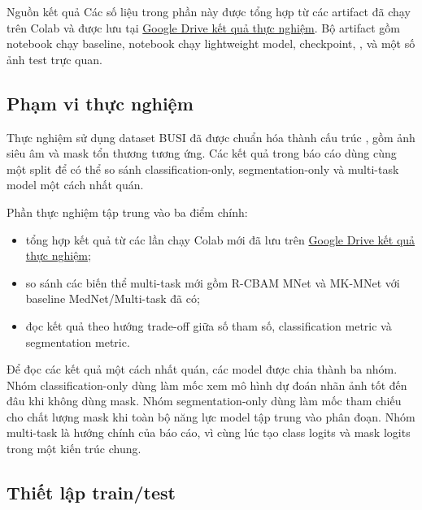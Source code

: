 \documentclass[12pt,a4paper]{article}
\newcommand{\resultdrive}{\href{https://drive.google.com/drive/folders/1ZFqnT5X12mwOahLquEp8JkauidLAaHGb}{Google Drive kết quả thực nghiệm}}
\begin{document}
\begin{methodbox}{Nguồn kết quả}
Các số liệu trong phần này được tổng hợp từ các artifact đã chạy trên Colab và được lưu tại \resultdrive. Bộ artifact gồm notebook chạy baseline, notebook chạy lightweight model, checkpoint, ,  và một số ảnh test trực quan.
\end{methodbox}

\subsection{Phạm vi thực nghiệm}

Thực nghiệm sử dụng dataset BUSI đã được chuẩn hóa thành cấu trúc , gồm ảnh siêu âm và mask tổn thương tương ứng. Các kết quả trong báo cáo dùng cùng một split để có thể so sánh classification-only, segmentation-only và multi-task model một cách nhất quán.

Phần thực nghiệm tập trung vào ba điểm chính:

\begin{itemize}
    \item tổng hợp kết quả từ các lần chạy Colab mới đã lưu trên \resultdrive;
    \item so sánh các biến thể multi-task mới gồm R-CBAM MNet và MK-MNet với baseline MedNet/Multi-task đã có;
    \item đọc kết quả theo hướng trade-off giữa số tham số, classification metric và segmentation metric.
\end{itemize}

Để đọc các kết quả một cách nhất quán, các model được chia thành ba nhóm. Nhóm classification-only dùng làm mốc xem mô hình dự đoán nhãn ảnh tốt đến đâu khi không dùng mask. Nhóm segmentation-only dùng làm mốc tham chiếu cho chất lượng mask khi toàn bộ năng lực model tập trung vào phân đoạn. Nhóm multi-task là hướng chính của báo cáo, vì cùng lúc tạo class logits và mask logits trong một kiến trúc chung.

\subsection{Thiết lập train/test}
\end{document}
